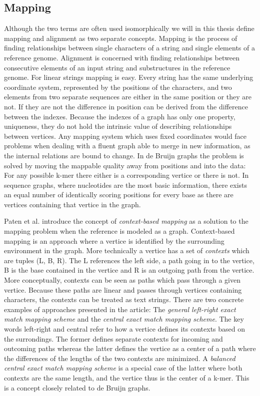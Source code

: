 \documentclass[thesis.tex]{subfiles}
\begin{document}
\subsection{Mapping}
Although the two terms are often used isomorphically we will in this thesis define mapping and alignment as two separate concepts. Mapping is the process of finding relationships between single characters of a string and single elements of a reference genome. Alignment is concerned with finding relationships between consecutive elements of an input string and substructures in the reference genome. For linear strings mapping is easy. Every string has the same underlying coordinate system, represented by the positions of the characters, and two elements from two separate sequences are either in the same position or they are not. If they are not the difference in position can be derived from the difference between the indexes. Because the indexes of a graph has only one property, uniqueness, they do not hold the intrinsic value of describing relationships between vertices. Any mapping system which uses fixed coordinates would face problems when dealing with a fluent graph able to merge in new information, as the internal relations are bound to change. In de Bruijn graphs the problem is solved by moving the mappable quality away from positions and into the data: For any possible k-mer there either is a corresponding vertice or there is not. In sequence graphs, where nucleotides are the most basic information, there exists an equal number of identically scoring positions for every base as there are vertices containing that vertice in the graph.\\
\par\noindent
Paten et al.\cite{mapping_to_a_reference_genome_structure} introduce the concept of \textit{context-based mapping} as a solution to the mapping problem when the reference is modeled as a graph. Context-based mapping is an approach where a vertice is identified by the surrounding environment in the graph. More technically a vertice has a set of \textit{contexts} which are tuples (L, B, R). The L references the left side, a path going in to the vertice, B is the base contained in the vertice and R is an outgoing path from the vertice. More conceptually, contexts can be seen as paths which pass through a given vertice. Because these paths are linear and passes through vertices containing characters, the contexts can be treated as text strings. There are two concrete examples of approaches presented in the article: The \textit{general left-right exact match mapping scheme} and the \textit{central exact match mapping scheme}. The key words left-right and central refer to how a vertice defines its contexts based on the surrondings. The former defines separate contexts for incoming and outcoming paths whereas the latter defines the vertice as a center of a path where the differences of the lengths of the two contexts are minimized. A  \textit{balanced central exact match mapping scheme} is a special case of the latter where both contexts are the same length, and the vertice thus is the center of a k-mer. This is a concept closely related to de Bruijn graphs.\\
\end{document}
